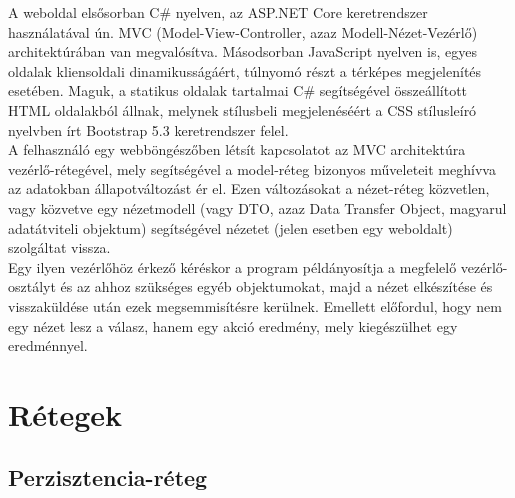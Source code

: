 A weboldal elsősorban C\# nyelven, az ASP.NET Core keretrendszer használatával ún. MVC (Model-View-Controller, azaz Modell-Nézet-Vezérlő) architektúrában van megvalósítva. Másodsorban JavaScript nyelven is, egyes oldalak kliensoldali dinamikusságáért, túlnyomó részt a térképes megjelenítés esetében. Maguk, a statikus oldalak tartalmai C\# segítségével összeállított HTML oldalakból állnak, melynek stílusbeli megjelenéséért a CSS stílusleíró nyelvben írt Bootstrap 5.3 keretrendszer felel.\\
A felhasználó egy webböngészőben létsít kapcsolatot az MVC architektúra vezérlő-rétegével, mely segítségével a model-réteg bizonyos műveleteit meghívva az adatokban állapotváltozást ér el. Ezen változásokat a nézet-réteg közvetlen, vagy közvetve egy nézetmodell (vagy DTO, azaz Data Transfer Object, magyarul adatátviteli objektum) segítségével nézetet (jelen esetben egy weboldalt) szolgáltat vissza.\\
Egy ilyen vezérlőhöz érkező kéréskor a program példányosítja a megfelelő vezérlő-osztályt és az ahhoz szükséges egyéb objektumokat, majd a nézet elkészítése és visszaküldése után ezek megsemmisítésre kerülnek. Emellett előfordul, hogy nem egy nézet lesz a válasz, hanem egy akció eredmény, mely kiegészülhet egy eredménnyel.

\section{Rétegek}

\subsection{Perzisztencia-réteg}
\label{subsec:persistence}

